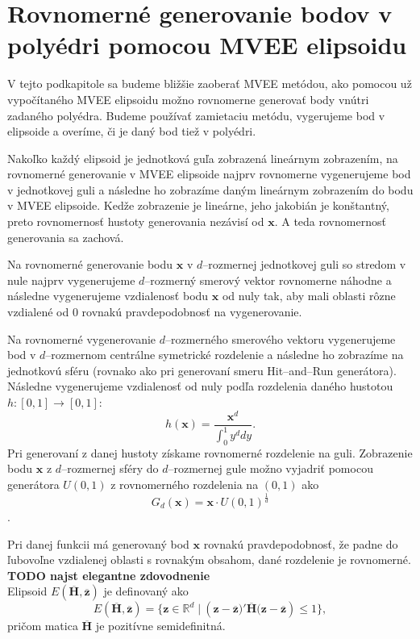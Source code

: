 \section {Rovnomerné generovanie bodov v polyédri pomocou MVEE elipsoidu}

V tejto podkapitole sa budeme bližšie zaoberať MVEE metódou, ako pomocou už vypočítaného MVEE elipsoidu možno rovnomerne generovať body vnútri zadaného polyédra. Budeme používať zamietaciu metódu, vygerujeme bod v elipsoide a overíme, či je daný bod tiež v polyédri.

Nakoľko každý elipsoid je jednotková guľa zobrazená lineárnym zobrazením, na rovnomerné generovanie v MVEE elipsoide najprv rovnomerne vygenerujeme bod v jednotkovej guli a následne ho zobrazíme daným lineárnym zobrazením do bodu v MVEE elipsoide. Kedže zobrazenie je lineárne, jeho jakobián je konštantný, preto rovnomernosť hustoty generovania nezávisí od $\mathbf x$. A teda rovnomernosť generovania sa zachová.\\
\label{generovanie_v_mvee}

Na rovnomerné generovanie bodu $\mathbf x$ v $d$--rozmernej jednotkovej guli so stredom v nule najprv vygenerujeme $d$--rozmerný smerový vektor rovnomerne náhodne a následne vygenerujeme vzdialenosť bodu $\mathbf x$ od nuly tak, aby mali oblasti rôzne vzdialené od $0$ rovnakú pravdepodobnosť na vygenerovanie.

Na rovnomerné vygenerovanie $d$--rozmerného smerového vektoru vygenerujeme bod v $d$--rozmernom centrálne symetrické rozdelenie a následne ho zobrazíme na jednotkovú sféru (rovnako ako pri generovaní smeru Hit--and--Run generátora). Následne vygenerujeme vzdialenosť od nuly podľa rozdelenia daného hustotou $h:[0,1] \rightarrow [0,1]$: $$h(\mathbf x)=\frac{\mathbf x^d}{\int_0^1 y^d dy}.$$
Pri generovaní z danej hustoty získame rovnomerné rozdelenie na guli. Zobrazenie bodu $\mathbf x$ z $d$--rozmernej sféry do $d$--rozmernej gule možno vyjadriť pomocou generátora $U(0,1)$ z rovnomerného rozdelenia na $(0,1)$ ako 
$$G_d(\mathbf x)=\mathbf x\cdot U(0,1)^{\frac{1}{d}}$$.

Pri danej funkcii má generovaný bod $\mathbf x$ rovnakú pravdepodobnosť, že padne do ľubovoľne vzdialenej oblasti s rovnakým obsahom, dané rozdelenie je rovnomerné. \textbf{TODO najst elegantne zdovodnenie}\\

Elipsoid $E(\mathbf{\overline H, \overline z})$ je definovaný ako 
$$E(\mathbf{\overline H, \overline z})= \{ \mathbf{z} \in \mathbb{R}^d \; | \: (\mathbf{z-\overline z)'\overline H(z-\overline z}) \le 1 \}, $$
pričom matica $\mathbf{\overline H}$ je pozitívne semidefinitná.

